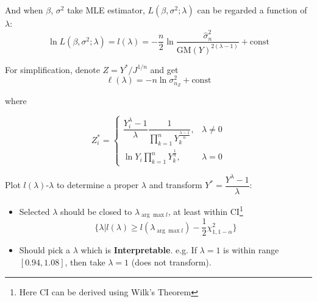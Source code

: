             And when $ \beta  $, $ \sigma ^2 $ take MLE estimator, $ L(\beta ,\sigma ^2;\lambda ) $ can be regarded a function of $ \lambda  $:
            \begin{equation}
                \ln L(\beta ,\sigma ^2;\lambda )=l(\lambda )=-\dfrac{n}{2}\ln \dfrac{\hat{\sigma}^2_n}{\mathrm{GM}(Y)^{2(\lambda -1)}}+\mathrm{const}
            \end{equation}
    
            For simplification, denote $ Z=Y^*/J^{1/n} $ and get
            \begin{equation}
                \ell (\lambda )=-n\ln \sigma^2_{n_Z}+\mathrm{const} 
            \end{equation}
            
            where 
    
            \begin{equation}
                Z_i^* =\begin{cases}
                    \dfrac{Y_i^\lambda-1 }{\lambda }\dfrac{1}{\prod\limits_{k=1}^n Y_k^{\frac{\lambda -1}{n}}},&\lambda \neq 0\\
                    \ln Y_i\prod\limits_{k=1}^n Y_k^{\frac{1}{n}},&\lambda =0
                \end{cases}
            \end{equation}
    
            Plot $ l(\lambda ) $-$ \lambda  $ to determine a proper $ \lambda  $ and transform $ Y^*=\dfrac{Y^\lambda -1}{\lambda } $:
            \begin{itemize}[topsep=2pt,itemsep=2pt]
                \item Selected $ \lambda $ should be closed to $ \lambda_{\arg\max l} $, at least within CI\footnote{Here CI can be derived using Wilk's Theorem}
                \begin{equation}
                    \{\lambda |l(\lambda )\geq l(\lambda_{\arg\max l})-\dfrac{1}{2}\chi^2_{1,1-\alpha }\}
                \end{equation}
                \item Should pick a $ \lambda  $ which is \textbf{Interpretable}. e.g. If $ \lambda =1 $ is within range $ [0.94,1.08] $, then take $ \lambda =1 $ (does not transform).
                
                
            \end{itemize}
            
                
            
